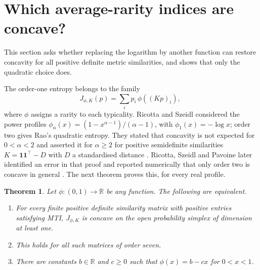 \documentclass[11pt,a4paper]{article}
\newtheorem{theorem}{Theorem}
\theoremstyle{remark}
\newcommand{\one}{\mathbf 1}
\newcommand{\R}{\mathbb R}
\begin{document}
\section{Which average-rarity indices are concave?}\label{sec:rarity}
This section asks whether replacing the logarithm by another function can restore concavity for all positive definite metric similarities, and shows that only the quadratic choice does.

The order-one entropy belongs to the family
\[
 J_{\phi,K}(p)=\sum_i p_i\,\phi((Kp)_i),
\]
where $\phi$ assigns a rarity to each typicality. Ricotta and Szeidl \cite[Appendix A]{rs} considered the power profiles $\phi_\alpha(x)=(1-x^{\alpha-1})/(\alpha-1)$, with $\phi_1(x)=-\log x$; order two gives Rao's quadratic entropy. They stated that concavity is not expected for $0<\alpha<2$ and asserted it for $\alpha\ge2$ for positive semidefinite similarities $K=\one\one^\top-D$ with $D$ a standardised distance \cite[Theorem 2]{rs}. Ricotta, Szeidl and Pavoine later identified an error in that proof and reported numerically that only order two is concave in general \cite{rsp}. The next theorem proves this, for every real profile.

\begin{theorem}\label{thm:rarity}
Let $\phi:(0,1)\to\R$ be any function. The following are equivalent.
\begin{enumerate}
\item For every finite positive definite similarity matrix with positive entries satisfying MTI, $J_{\phi,K}$ is concave on the open probability simplex of dimension at least one.
\item This holds for all such matrices of order seven.
\item There are constants $b\in\R$ and $c\ge0$ such that $\phi(x)=b-cx$ for $0<x<1$.
\end{enumerate}
\end{theorem}
\end{document}
